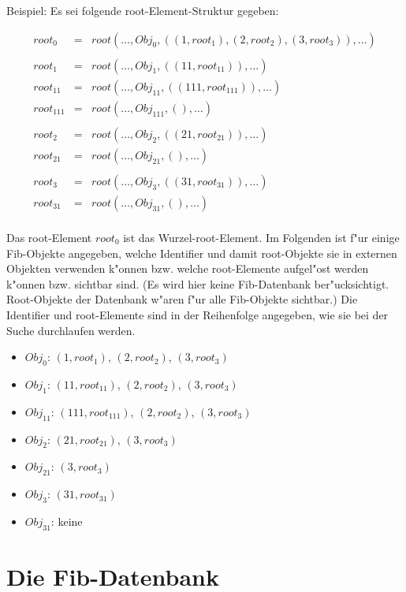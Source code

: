 \bigskip\noindent
Beispiel: Es sei folgende root-Element-Struktur gegeben:

\begin{eqnarray*}
root_0&=&root( \ldots , Obj_0 , (( 1, root_1), ( 2, root_2), ( 3, root_3)), \ldots )\\
\\
root_1&=&root( \ldots , Obj_1 , (( 11, root_{11})),  \ldots )\\
root_{11}&=&root( \ldots , Obj_{11} , (( 111, root_{111})), \ldots )\\
root_{111}&=&root( \ldots , Obj_{111} , (), \ldots )\\
\\
root_2&=&root( \ldots , Obj_2 , (( 21, root_{21})),  \ldots )\\
root_{21}&=&root( \ldots , Obj_{21} , (), \ldots )\\
\\
root_3&=&root( \ldots , Obj_3 , (( 31, root_{31})),  \ldots )\\
root_{31}&=&root( \ldots , Obj_{31} , (), \ldots )\\
\end{eqnarray*}

Das root-Element $root_0$ ist das Wurzel-root-Element.
Im Folgenden ist f"ur einige Fib-Objekte angegeben, welche Identifier und damit root-Objekte sie in externen Objekten verwenden k"onnen bzw. welche root-Elemente aufgel"ost werden k"onnen bzw. sichtbar sind. (Es wird hier keine Fib-Datenbank ber"ucksichtigt. Root-Objekte der Datenbank w"aren f"ur alle Fib-Objekte sichtbar.) Die Identifier und root-Elemente sind in der Reihenfolge angegeben, wie sie bei der Suche durchlaufen werden.
\begin{itemize}
 \item $Obj_0$: $( 1, root_1)$, $( 2, root_2)$, $( 3, root_3)$
 \item $Obj_1$: $( 11, root_{11})$, $( 2, root_2)$, $( 3, root_3)$
 \item $Obj_{11}$: $( 111, root_{111})$, $( 2, root_2)$, $( 3, root_3)$
 \item $Obj_2$: $( 21, root_{21})$, $( 3, root_3)$
 \item $Obj_{21}$: $( 3, root_3)$
 \item $Obj_3$: $( 31, root_{31})$
 \item $Obj_{31}$: keine
\end{itemize}



\section{Die Fib-Datenbank}
\label{secFibDatabase}

